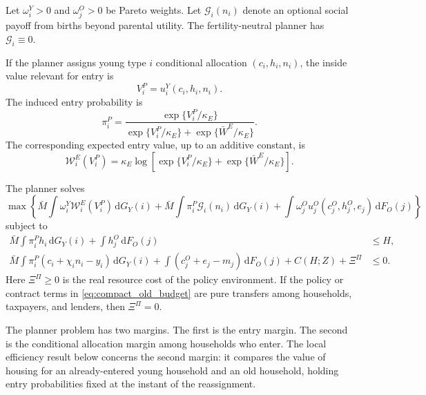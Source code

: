\documentclass[11pt]{article}
\newcommand{\dd}{\mathrm d}
\newcommand{\1}{\mathbf 1}
\begin{document}
Let $\omega_i^Y>0$ and $\omega_j^O>0$ be Pareto weights. Let $\mathcal G_i(n_i)$ denote an optional social payoff from births beyond parental utility. The fertility-neutral planner has $\mathcal G_i\equiv0$.

If the planner assigns young type $i$ conditional allocation $(c_i,h_i,n_i)$, the inside value relevant for entry is
\begin{equation}
V_i^P=u_i^Y(c_i,h_i,n_i).
\label{eq:compact_planner_inside_value}
\end{equation}
The induced entry probability is
\begin{equation}
\pi_i^P
=
\frac{
\exp\{V_i^P/\kappa_E\}
}{
\exp\{V_i^P/\kappa_E\}
+
\exp\{\bar W^E/\kappa_E\}
}.
\label{eq:compact_planner_entry_prob}
\end{equation}
The corresponding expected entry value, up to an additive constant, is
\begin{equation}
\mathcal W_i^E(V_i^P)
=
\kappa_E
\log
\left[
\exp\{V_i^P/\kappa_E\}
+
\exp\{\bar W^E/\kappa_E\}
\right].
\label{eq:compact_entry_logsum}
\end{equation}

The planner solves
\begin{equation}
\max
\left\{
\bar M\int
\omega_i^Y\mathcal W_i^E(V_i^P)\,\dd G_Y(i)
+
\bar M\int
\pi_i^P\mathcal G_i(n_i)\,\dd G_Y(i)
+
\int
\omega_j^O u_j^O(c_j^O,h_j^O,e_j)\,\dd F_O(j)
\right\}
\label{eq:compact_planner_problem}
\end{equation}
subject to
\begin{align}
\bar M\int \pi_i^P h_i\,\dd G_Y(i)
+
\int h_j^O\,\dd F_O(j)
&\le H,
\label{eq:compact_planner_housing}\\
\bar M\int
\pi_i^P(c_i+\chi_i n_i-y_i)\,\dd G_Y(i)
+
\int(c_j^O+e_j-m_j)\,\dd F_O(j)
+
C(H;Z)+\Xi^\Pi
&\le0.
\label{eq:compact_planner_goods}
\end{align}
Here $\Xi^\Pi\ge0$ is the real resource cost of the policy environment. If the policy or contract terms in \eqref{eq:compact_old_budget} are pure transfers among households, taxpayers, and lenders, then $\Xi^\Pi=0$.

The planner problem has two margins. The first is the entry margin. The second is the conditional allocation margin among households who enter. The local efficiency result below concerns the second margin: it compares the value of housing for an already-entered young household and an old household, holding entry probabilities fixed at the instant of the reassignment.
\end{document}
